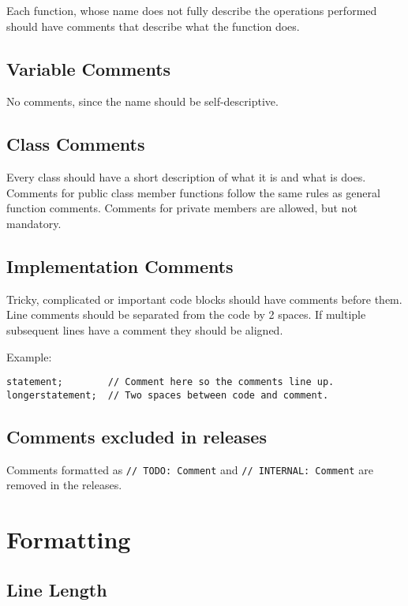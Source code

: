 \documentclass[a4paper]{article}
\newcommand{\inlinecode}[1]{\lstinline|#1|}
\begin{document}
Each function, whose name does not fully describe the operations performed should have comments that describe what the function does.

\subsection{Variable Comments}

No comments, since the name should be self-descriptive.

\subsection{Class Comments}

Every class should have a short description of what it is and what is does.
Comments for public class member functions follow the same rules as general function comments.
Comments for private members are allowed, but not mandatory.

\subsection{Implementation Comments}

Tricky, complicated or important code blocks should have comments before them.
Line comments should be separated from the code by 2 spaces. If multiple subsequent lines have a comment they should be aligned.

Example:
\begin{lstlisting}
statement;        // Comment here so the comments line up.
longerstatement;  // Two spaces between code and comment.
\end{lstlisting}

\subsection{Comments excluded in releases}

Comments formatted as \inlinecode{// TODO: Comment} and \inlinecode{// INTERNAL: Comment} are removed in the releases.


\section{Formatting}

\subsection{Line Length}
\end{document}

